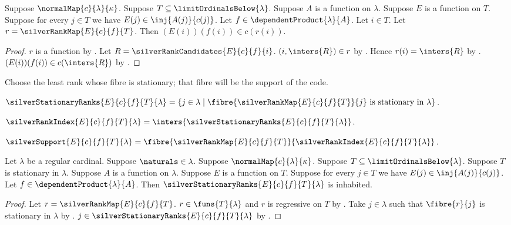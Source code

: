\begin{proposition}\label{silver_rank_map_codes_value}
    Suppose $\normalMap{c}{\lambda}{\kappa}$.
    Suppose $T\subseteq\limitOrdinalsBelow{\lambda}$.
    Suppose $A$ is a function on $\lambda$.
    Suppose $E$ is a function on $T$.
    Suppose for every $j\in T$ we have
        $E(j)\in\inj{A(j)}{c(j)}$.
    Let $f\in\dependentProduct{\lambda}{A}$.
    Let $i\in T$.
    Let $r=\silverRankMap{E}{c}{f}{T}$.
    Then $(E(i))(f(i))\in c(r(i))$.
\end{proposition}
\begin{proof}
    $r$ is a function by
        .
    Let $R=\silverRankCandidates{E}{c}{f}{i}$.
    $(i,\inters{R})\in r$ by .
    Hence $r(i)=\inters{R}$ by .
    $(E(i))(f(i))\in c(\inters{R})$
        by .
\end{proof}

Choose the least rank whose fibre is stationary; that fibre will be the
support of the code.

\begin{definition}\label{silver_stationary_ranks}
    $\silverStationaryRanks{E}{c}{f}{T}{\lambda}
        =\{j\in\lambda\mid
            \text{$\fibre{\silverRankMap{E}{c}{f}{T}}{j}$ is stationary in
                $\lambda$}\}$.
\end{definition}

\begin{definition}\label{silver_rank_index}
    $\silverRankIndex{E}{c}{f}{T}{\lambda}
        =\inters{\silverStationaryRanks{E}{c}{f}{T}{\lambda}}$.
\end{definition}

\begin{definition}\label{silver_support}
    $\silverSupport{E}{c}{f}{T}{\lambda}
        =\fibre{\silverRankMap{E}{c}{f}{T}}
            {\silverRankIndex{E}{c}{f}{T}{\lambda}}$.
\end{definition}

\begin{theorem}\label{silver_stationary_ranks_inhabited}
    Let $\lambda$ be a regular cardinal.
    Suppose $\naturals\in\lambda$.
    Suppose $\normalMap{c}{\lambda}{\kappa}$.
    Suppose $T\subseteq\limitOrdinalsBelow{\lambda}$.
    Suppose $T$ is stationary in $\lambda$.
    Suppose $A$ is a function on $\lambda$.
    Suppose $E$ is a function on $T$.
    Suppose for every $j\in T$ we have
        $E(j)\in\inj{A(j)}{c(j)}$.
    Let $f\in\dependentProduct{\lambda}{A}$.
    Then $\silverStationaryRanks{E}{c}{f}{T}{\lambda}$ is inhabited.
\end{theorem}
\begin{proof}
    Let $r=\silverRankMap{E}{c}{f}{T}$.
    $r\in\funs{T}{\lambda}$ and $r$ is regressive on $T$
        by .
    Take $j\in\lambda$ such that
        $\fibre{r}{j}$ is stationary in $\lambda$ by .
    $j\in\silverStationaryRanks{E}{c}{f}{T}{\lambda}$
        by .
\end{proof}

